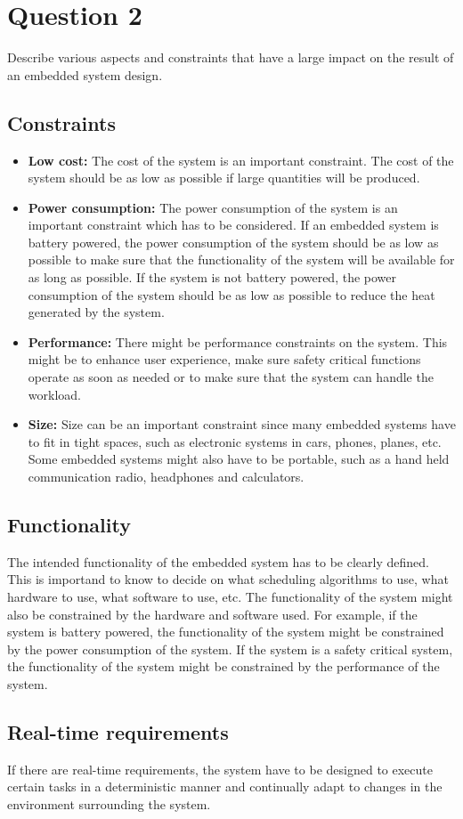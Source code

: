 \section*{Question 2}
Describe various aspects and constraints that have a large impact on the result of an embedded system design.
    \subsection*{Constraints}
    \begin{itemize}
        \item \textbf{Low cost:} The cost of the system is an important constraint. The cost of the system should be as low as possible if large quantities will be produced.
        \item \textbf{Power consumption:} The power consumption of the system is an important constraint which has to be considered. If an embedded system is battery powered, the power consumption of the system should be as low as possible to make sure that the functionality of the system will be available for as long as possible. If the system is not battery powered, the power consumption of the system should be as low as possible to reduce the heat generated by the system.
        \item \textbf{Performance:} There might be performance constraints on the system. This might be to enhance user experience, make sure safety critical functions operate as soon as needed or to make sure that the system can handle the workload.
        \item \textbf{Size:} Size can be an important constraint since many embedded systems have to fit in tight spaces, such as electronic systems in cars, phones, planes, etc. Some embedded systems might also have to be portable, such as a hand held communication radio, headphones and calculators.
    \end{itemize}

    \subsection*{Functionality}
    The intended functionality of the embedded system has to be clearly defined. This is importand to know to decide on what scheduling algorithms to use, what hardware to use, what software to use, etc. The functionality of the system might also be constrained by the hardware and software used. For example, if the system is battery powered, the functionality of the system might be constrained by the power consumption of the system. If the system is a safety critical system, the functionality of the system might be constrained by the performance of the system.

    \subsection*{Real-time requirements}
    If there are real-time requirements, the system have to be designed to execute certain tasks in a deterministic manner and continually adapt to changes in the environment surrounding the system.